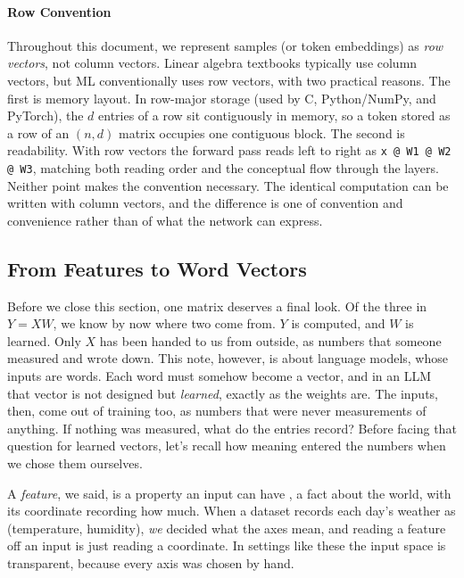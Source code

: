\documentclass[11pt]{article}
\begin{document}
\paragraph{Row Convention} Throughout this document, we represent samples (or token embeddings) as \textit{row vectors}, not column vectors. Linear algebra textbooks typically use column vectors, but ML conventionally uses row vectors, with two practical reasons. The first is memory layout. In row-major storage (used by C, Python/NumPy, and PyTorch), the $d$ entries of a row sit contiguously in memory, so a token stored as a row of an $(n, d)$ matrix occupies one contiguous block. The second is readability. With row vectors the forward pass reads left to right as \texttt{x @ W1 @ W2 @ W3}, matching both reading order and the conceptual flow through the layers. Neither point makes the convention necessary. The identical computation can be written with column vectors, and the difference is one of convention and convenience rather than of what the network can express.

\subsection*{From Features to Word Vectors}

Before we close this section, one matrix deserves a final look. Of the three in $Y = XW$, we know by now where two come from. $Y$ is computed, and $W$ is learned. Only $X$ has been handed to us from outside, as numbers that someone measured and wrote down. This note, however, is about language models, whose inputs are words. Each word must somehow become a vector, and in an LLM that vector is not designed but \emph{learned}, exactly as the weights are. The inputs, then, come out of training too, as numbers that were never measurements of anything. If nothing was measured, what do the entries record? Before facing that question for learned vectors, let's recall how meaning entered the numbers when we chose them ourselves.

A \emph{feature}, we said, is a property an input can have \citep{elhage2022toy}, a fact about the world, with its coordinate recording how much. When a dataset records each day's weather as (temperature, humidity), \emph{we} decided what the axes mean, and reading a feature off an input is just reading a coordinate. In settings like these the input space is transparent, because every axis was chosen by hand.
\end{document}

